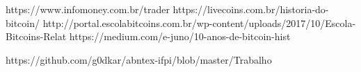 https://www.infomoney.com.br/trader
https://livecoins.com.br/historia-do-bitcoin/
http://portal.escolabitcoins.com.br/wp-content/uploads/2017/10/Escola-Bitcoins-Relat%
https://medium.com/e-juno/10-anos-de-bitcoin-hist%

https://github.com/g0dkar/abntex-ifpi/blob/master/Trabalho%